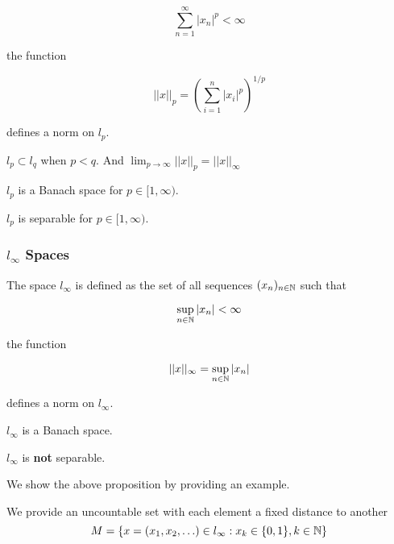 \documentclass{article}
\begin{document}
\begin{equation*}
    \sum_{n=1}^{\infty} |x_n|^p < \infty
\end{equation*}

the function  

\begin{equation*}
    ||x||_p = \left(\sum_{i=1}^n |x_i|^p\right)^{1/p}
\end{equation*}  

defines a norm on $l_p$.  
\begin{remark}
    $l_p \subset l_q$ when $p < q$. And $\lim_{p\to \infty} ||x||_p = ||x||_{\infty}$
\end{remark}  

\begin{prop}
    $l_p$ is a Banach space for $p \in [1,\infty)$.
\end{prop}  

\begin{prop}
    $l_p$ is separable for $p \in [1,\infty)$.
\end{prop}  


\subsubsection*{$l_\infty$ Spaces}  
The space $l_\infty$ is defined as the set of all sequences $(x_n)_{n\in \mathbb{N}}$ such that

\begin{equation*}
    \sup_{n\in \mathbb{N}} |x_n| < \infty
\end{equation*}

the function

\begin{equation*}
    ||x||_\infty = \sup_{n\in \mathbb{N}} |x_n|
\end{equation*}

defines a norm on $l_\infty$.  

\begin{prop}
    $l_\infty$ is a Banach space.
\end{prop}

\begin{prop}
    $l_{\infty}$ is \textbf{not} separable.  
\end{prop} 

We show the above proposition by providing an example.  

\begin{eg}
    We provide an uncountable set with each element a fixed distance to another  
    \begin{equation*}
        M = \{x = (x_1, x_2, \ldots)\in l_{\infty}: x_k \in \{0,1\}, k\in \mathbb{N}\}
    \end{equation*}
\end{eg}
\end{document}
